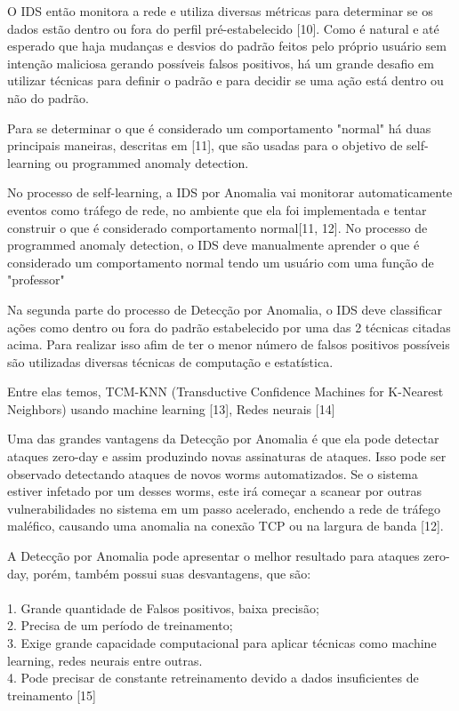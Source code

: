 \documentclass[conference]{IEEEtran}
\begin{document}
O IDS então monitora a rede e utiliza diversas métricas para determinar se os dados estão dentro ou fora do perfil pré-estabelecido [10]. Como é natural e até esperado que haja mudanças e desvios do padrão feitos pelo próprio usuário sem intenção maliciosa gerando possíveis falsos positivos, há um grande desafio em utilizar técnicas para definir o padrão e para decidir se uma ação está dentro ou não do padrão.

Para se determinar o que é considerado um comportamento "normal" há duas principais maneiras, descritas em [11], que são usadas para o objetivo de self-learning ou programmed anomaly detection.

No processo de self-learning, a IDS por Anomalia vai monitorar automaticamente eventos como tráfego de rede, no ambiente que ela foi implementada e tentar construir o que é considerado comportamento normal[11, 12]. No processo de programmed anomaly detection, o IDS deve manualmente aprender o que é considerado um comportamento normal tendo um usuário com uma função de "professor" 

Na segunda parte do processo de Detecção por Anomalia, o IDS deve classificar ações como dentro ou fora do padrão estabelecido por uma das 2 técnicas citadas acima. Para realizar isso afim de ter o menor número de falsos positivos possíveis são utilizadas diversas técnicas de computação e estatística.

Entre elas temos, TCM-KNN (Transductive Confidence Machines for K-Nearest Neighbors) usando machine learning [13], Redes neurais [14]

Uma das grandes vantagens da Detecção por Anomalia é que ela pode detectar ataques zero-day e assim produzindo novas assinaturas de ataques. Isso pode ser observado detectando ataques de novos worms automatizados. Se o sistema estiver infetado por um desses worms, este irá começar a scanear por outras vulnerabilidades no sistema em um passo acelerado, enchendo a rede de tráfego maléfico, causando uma anomalia na conexão TCP ou na largura de banda [12].

A Detecção por Anomalia pode apresentar o melhor resultado para ataques zero-day, porém, também possui suas desvantagens, que são:\\\\
	1. Grande quantidade de Falsos positivos, baixa precisão;\\
    2. Precisa de um período de treinamento;\\
    3. Exige grande capacidade computacional para aplicar técnicas como machine learning, redes neurais entre outras.\\
    4. Pode precisar de constante retreinamento devido a dados insuficientes de treinamento [15]
\end{document}
